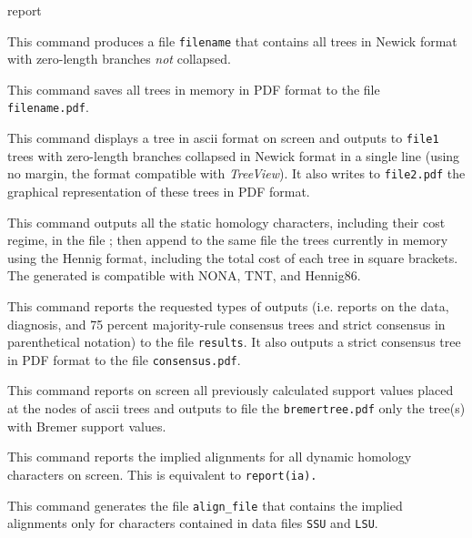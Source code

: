 \begin{command}{report}{}
\begin{poyexamples}
{This command produces a file \texttt{filename} that contains
all trees in Newick format with zero-length branches \emph{not}
collapsed.}

{This command saves all trees in memory in
PDF format to the file \texttt{filename.pdf}.}

{This command displays a tree in ascii format on screen and outputs
to \texttt{file1} trees with zero-length branches collapsed in Newick format
in a single line (using no margin, the format compatible with \emph{TreeView}). It
also writes to \texttt{file2.pdf} the graphical representation of these trees in
PDF format.}

{This command outputs all the static homology characters, including their cost
regime, in the file ; then append to the same
file the trees currently in memory using the Hennig format, 
including the total cost of each tree in square brackets. The
generated  is compatible with NONA, TNT, and
Hennig86.
 }

{This command reports the requested types of outputs (i.e.
reports on the data, diagnosis, and 75 percent majority-rule consensus 
trees and strict consensus in parenthetical notation) to the file
\texttt{results}. It also outputs a strict consensus tree in PDF format
to the file \texttt{consensus.pdf}.}

{This command reports on screen all previously calculated support values
placed at the nodes of ascii trees and outputs to file the \texttt{bremertree.pdf}
only the tree(s) with Bremer support values.}

{This command reports the implied alignments for all dynamic homology
characters on screen. This is equivalent to \texttt{report(ia).}}

{This command generates the file \texttt{align\_file} that contains
the implied alignments only for characters contained in data files
\texttt{SSU} and \texttt{LSU}.}


\end{poyexamples}
\end{command}
